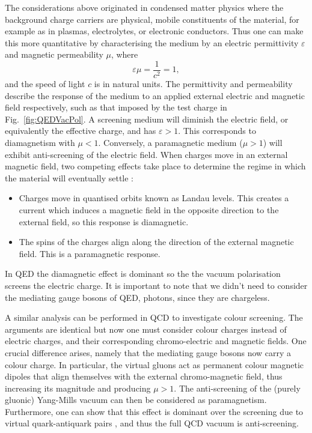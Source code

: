 \documentclass[11pt, a4paper, twoside]{book}
\begin{document}
The considerations above originated in condensed matter physics where the background charge carriers are physical, mobile constituents of the material, for example as in plasmas, electrolytes, or electronic conductors. Thus one can make this more quantitative by characterising the medium by an electric permittivity \(\varepsilon\) and magnetic permeability \(\mu\), where
\begin{equation}
\varepsilon\mu=\frac{1}{c^2}=1,
\end{equation} 
and the speed of light \(c\) is in natural units. The permittivity and permeability describe the response of the medium to an applied external electric and magnetic field respectively, such as that imposed by the test charge in Fig.~\ref{fig:QEDVacPol}. A screening medium will diminish the electric field, or equivalently the effective charge, and has \(\varepsilon >1\). This corresponds to diamagnetism with \(\mu <1\). Conversely, a paramagnetic medium (\(\mu >1\)) will exhibit anti-screening of the electric field. When charges move in an external magnetic field, two competing effects take place to determine the regime in which the material will eventually settle \cite{Kharzeev:2002fm}:
\begin{itemize}
\item{Charges move in quantised orbits known as Landau levels. This creates a current which induces a magnetic field in the opposite direction to the external field, so this response is diamagnetic.}
\item{The spins of the charges align along the direction of the external magnetic field. This is a paramagnetic response.}
\end{itemize}
In QED the diamagnetic effect is dominant so the the vacuum polarisation screens the electric charge. It is important to note that we didn't need to consider the mediating gauge bosons of QED, photons, since they are chargeless.

A similar analysis can be performed in QCD to investigate colour screening. The arguments are identical but now one must consider colour charges instead of electric charges, and their corresponding chromo-electric and magnetic fields. One crucial difference arises, namely that the mediating gauge bosons now carry a colour charge. In particular, the virtual gluons act as permanent colour magnetic dipoles that align themselves with the external chromo-magnetic field, thus increasing its magnitude and producing \(\mu >1\). The anti-screening of the (purely gluonic) Yang-Mills vacuum can then be considered as paramagnetism. Furthermore, one can show that this effect is dominant over the screening due to virtual quark-antiquark pairs \cite{Nielsen:AF_spin}, and thus the full QCD vacuum is anti-screening.  
\end{document}
